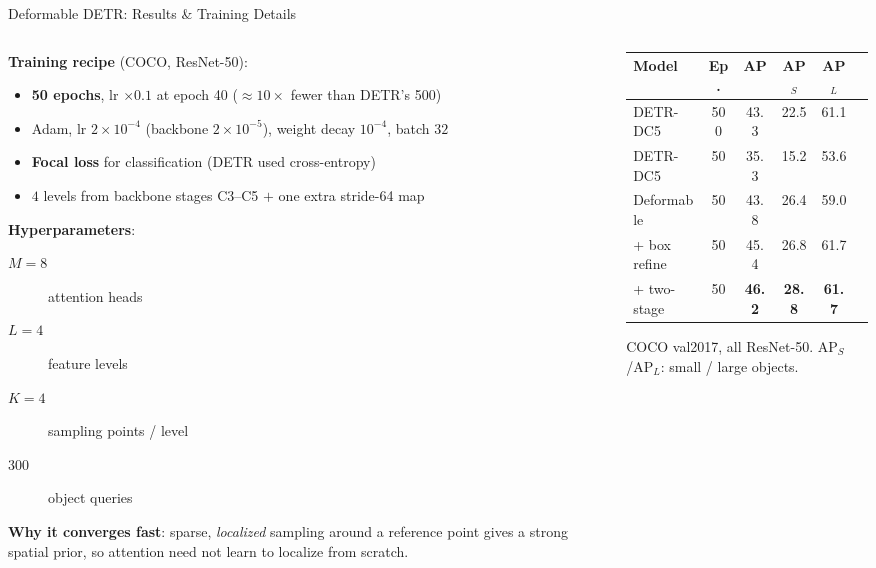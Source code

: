 \begin{frame}{Deformable DETR: Results \& Training Details}

  \begin{columns}
    \begin{column}{0.46\textwidth}
      \textbf{Training recipe} (COCO, ResNet-50):
      \begin{itemize}
        \item \textbf{50 epochs}, lr $\times 0.1$ at epoch 40 ($\approx 10\times$ fewer than DETR's 500)
        \item Adam, lr $2{\times}10^{-4}$ (backbone $2{\times}10^{-5}$), weight decay $10^{-4}$, batch $32$
        \item \textbf{Focal loss} for classification (DETR used cross-entropy)
        \item $4$ levels from backbone stages C3--C5 $+$ one extra stride-64 map
      \end{itemize}

      \vspace{0.3em}
      \textbf{Hyperparameters}:
      \begin{description}
        \item[$M{=}8$] attention heads
        \item[$L{=}4$] feature levels
        \item[$K{=}4$] sampling points / level
        \item[$300$] object queries
      \end{description}

      \vspace{0.3em}
      \textbf{Why it converges fast}: sparse, \emph{localized} sampling around a reference point gives a strong spatial prior, so attention need not learn to localize from scratch.
    \end{column}
    \begin{column}{0.52\textwidth}
      \begin{center}
        \small
        \begin{tabular}{lccccc}
          \toprule
          \textbf{Model} & \textbf{Ep.} & \textbf{AP} & \textbf{AP$_S$} & \textbf{AP$_L$} \\
          \midrule
          DETR-DC5        & 500 & 43.3 & 22.5 & 61.1 \\
          DETR-DC5        &  50 & 35.3 & 15.2 & 53.6 \\
          \midrule
          Deformable      &  50 & 43.8 & 26.4 & 59.0 \\
          \;+ box refine  &  50 & 45.4 & 26.8 & 61.7 \\
          \;+ two-stage   &  50 & \textbf{46.2} & \textbf{28.8} & \textbf{61.7} \\
          \bottomrule
        \end{tabular}
      \end{center}
      \vspace{-0.2em}
      {\footnotesize COCO val2017, all ResNet-50. AP$_S$/AP$_L$: small / large objects.}


\end{column}
\end{columns}
\end{frame}
